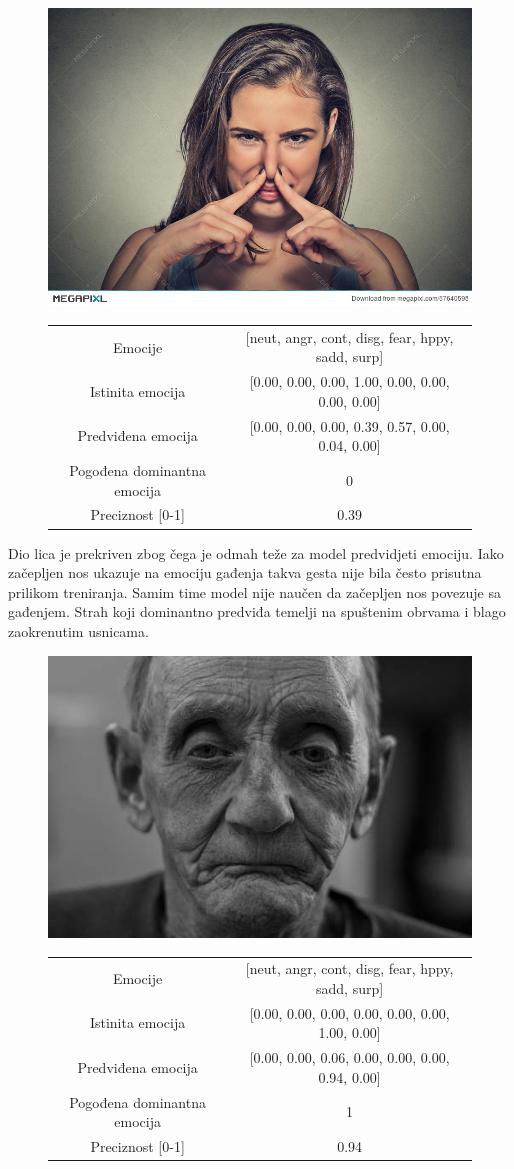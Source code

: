 \documentclass[times, utf8, zavrsni,numeric,pstricks]{fer}
\begin{document}
\begin{figure}[H]
\centering
		\includegraphics[width=0.3\linewidth, keepaspectratio]{139a57640598.png}
		\begin{tabular}
					{|c|c|}\hline
					Emocije & [neut, angr, cont, disg, fear, hppy, sadd, surp]\\
					Istinita emocija & [0.00, 0.00, 0.00, 1.00, 0.00, 0.00, 0.00, 0.00]\\
					Predviđena emocija	& [0.00, 0.00, 0.00, 0.39, 0.57, 0.00, 0.04, 0.00]\\								Pogođena dominantna emocija & 0\\
					Preciznost [0-1] & 0.39\\
					\hline
		\end{tabular}
\end{figure}


Dio lica je prekriven zbog čega je odmah teže za model predvidjeti emociju. Iako začepljen nos ukazuje na emociju gađenja takva gesta nije bila često prisutna prilikom treniranja. Samim time model nije naučen da začepljen nos povezuje sa gađenjem. Strah koji dominantno predviđa temelji na spuštenim obrvama i blago zaokrenutim usnicama.

\begin{figure}[H]
\centering
		\includegraphics[width=0.3\linewidth, keepaspectratio]{84apeople-man-making-sad-face-person-person-image.png}
		\begin{tabular}
					{|c|c|}\hline
					Emocije & [neut, angr, cont, disg, fear, hppy, sadd, surp]\\
					Istinita emocija & [0.00, 0.00, 0.00, 0.00, 0.00, 0.00, 1.00, 0.00]\\
					Predviđena emocija	& [0.00, 0.00, 0.06, 0.00, 0.00, 0.00, 0.94, 0.00]\\
					Pogođena dominantna emocija & 1\\
					Preciznost [0-1] & 0.94\\
					\hline
		\end{tabular}
\end{figure}
\end{document}
